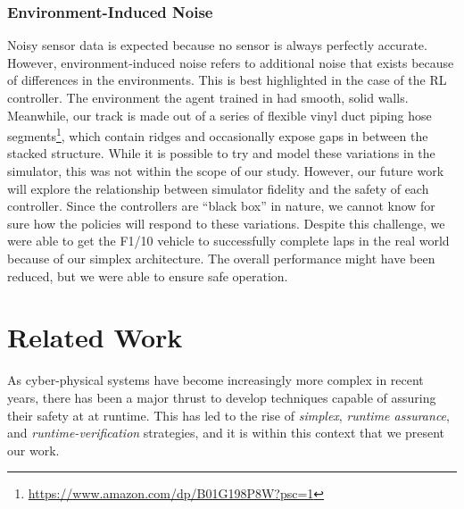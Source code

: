 \documentclass[manuscript,screen,review]{acmart}
\begin{document}
\subsubsection{Environment-Induced Noise} Noisy sensor data is expected because no sensor is always perfectly accurate. However, environment-induced noise refers to additional noise that exists because of differences in the environments. This is best highlighted in the case of the RL controller. The environment the agent trained in had smooth, solid walls. Meanwhile, our track is made out of a series of flexible vinyl duct piping hose segments\footnote{\url{https://www.amazon.com/dp/B01G198P8W?psc=1}}, which contain ridges and occasionally expose gaps in between the stacked structure.
While it is possible to try and model these variations in the simulator, this was not within the scope of our study. However, our future work will explore the relationship between simulator fidelity and the safety of each controller. Since the controllers are ``black box'' in nature, we cannot know for sure how the policies will respond to these variations. Despite this challenge, we were able to get the F1/10 vehicle to successfully complete laps in the real world because of our simplex architecture. The overall performance might have been reduced, but we were able to ensure safe operation.

\section{Related Work}

As cyber-physical systems have become increasingly more complex in recent years, there has been a major thrust to develop techniques capable of assuring their safety at at runtime. %
 This has led to the rise of \textit{simplex}, \textit{runtime assurance}, and \textit{runtime-verification} strategies, and it is within this context that we present our work.
\end{document}
